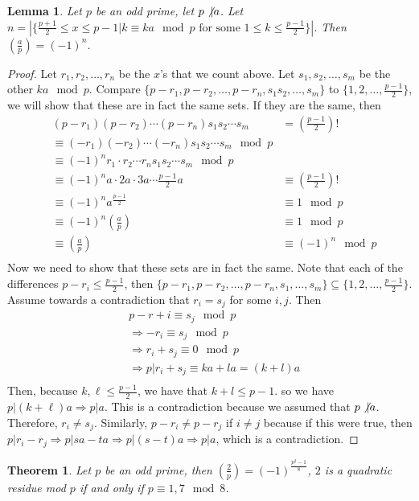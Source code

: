 \documentclass[11pt,letter]{article}
\renewcommand{\implies}{\Rightarrow}
\newcommand{\2}{\{0, 1\}}
\newcommand{\1}{\mathds{1}}
\newcounter{nLectures}
\newcounter{nTheorems}[nLectures]
\newtheorem{theorem}[nTheorems]{Theorem}
\newtheorem{lemma}[nTheorems]{Lemma}
\theoremstyle{definition}
\begin{document}
\begin{lemma}
	Let $p$ be an odd prime, let $p\not\vert a$. Let $n=|\{\frac{p+1}{2}\leq x\leq p-1\vert k\equiv ka\mod p \text{ for some }1\leq k\leq\frac{p-1}{2}\}|$.
	Then $\left(\frac{a}{p}\right)=(-1)^n$.
\end{lemma}
\begin{proof}
	Let $r_1, r_2,\dots, r_n$ be the $x$'s that we count above. Let $s_1,s_2,\dots,s_m$ be the other $ka\mod p$.
	Compare $\{p-r_1,p-r_2,\dots,p-r_n,s_1s_2,\dots,s_m\}$ to $\{1,2,\dots,\frac{p-1}{2}\}$, we will show that these
	are in fact the same sets.
	If they are the same, then
	\begin{align*}
		&(p-r_1)(p-r_2)\cdots(p-r_n)s_1s_2\cdots s_m&=\left(\frac{p-1}{2}\right)! \\
		&\equiv (-r_1)(-r_2)\cdots(-r_n)s_1s_2\cdots s_m\mod p \\
		&\equiv (-1)^n r_1\cdot r_2\cdots r_n s_1s_2\cdots s_m\mod p \\
		&\equiv (-1)^n a\cdot 2a\cdot 3a\cdots \frac{p-1}{2}a&\equiv \left(\frac{p-1}{2}\right)!\\
		&\equiv (-1)^n a^{\frac{p-1}{2}}&\equiv 1\mod p\\
		&\equiv (-1)^n \left(\frac{a}{p}\right)&\equiv 1\mod p\\
		&\equiv \left(\frac{a}{p}\right)&\equiv (-1)^n\mod p\\
	\end{align*}
	Now we need to show that these sets are in fact the same.
	Note that each of the differences $p-r_i\leq\frac{p-1}{2}$, then $\{p-r_1,p-r_2,\dots,p-r_n,s_1,\dots,s_m\}\subseteq\{1,2,\dots,\frac{p-1}{2}\}$.
	Assume towards a contradiction that $r_i=s_j$ for some $i,j$. Then
	\begin{align*}
		&p-r+i\equiv s_j\mod p \\
		&\implies -r_i\equiv s_j\mod p \\
		&\implies r_i+s_j\equiv 0\mod p \\
		&\implies p\vert r_i+s_j\equiv ka+la=(k+l)a\\
	\end{align*}
	Then, because $k,\ell\leq \frac{p-1}{2}$, we have that $k+l\leq p-1$. so we have $p\vert(k+\ell)a\implies p\vert a$. This is a contradiction
	because we assumed that $p\not\vert a$. Therefore, $r_i\neq s_j$. Similarly, $p-r_i\neq p-r_j$ if $i\neq j$ because if this were true, then
	$p\vert r_i-r_j\implies p\vert sa-ta\implies p\vert (s-t)a\implies p\vert a$, which is a contradiction.

\end{proof}

\begin{theorem}
	Let $p$ be an odd prime, then $\left(\frac{2}{p}\right)=(-1)^{\frac{p^2-1}{8}}$, $2$ is a quadratic residue
	mod $p$ if and only if $p\equiv 1,7\mod 8$.
\end{theorem}
\end{document}
